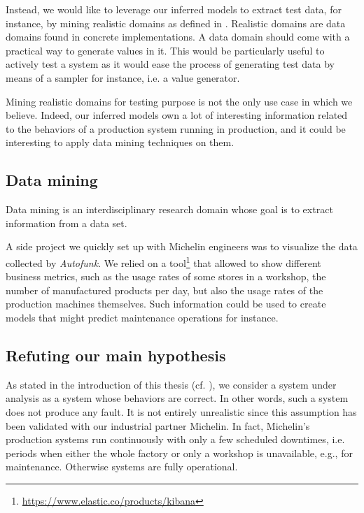 Instead, we would like to leverage our inferred models to extract
test data, for instance, by mining realistic domains as defined
in \cite{Enderlin:2011:PSL:2075545.2075551}. Realistic domains
are data domains found in concrete implementations. A data domain
should come with a practical way to generate values in it. This
would be particularly useful to actively test a system as it
would ease the process of generating test data by means of a
sampler for instance, i.e. a value generator.

Mining realistic domains for testing purpose is not the only use
case in which we believe. Indeed, our inferred models own a lot
of interesting information related to the behaviors of a
production system running in production, and it could be
interesting to apply data mining techniques on them.

\subsection{Data mining}
\label{sec:conclusion:testing:data}

Data mining \cite{chakrabarti2006data} is an interdisciplinary
research domain whose goal is to extract information from a data
set.

A side project we quickly set up with Michelin engineers was to
visualize the data collected by \textit{Autofunk}. We relied on a
tool\footnote{\url{https://www.elastic.co/products/kibana}} that
allowed to show different business metrics, such as the usage
rates of some stores in a workshop, the number of manufactured
products per day, but also the usage rates of the production
machines themselves. Such information could be used to create
models that might predict maintenance operations for instance.



\subsection{Refuting our main hypothesis}
\label{sec:conclusion:testing:valid}

As stated in the introduction of this thesis (cf.
), we consider a system
under analysis as a system whose behaviors are correct. In other
words, such a system does not produce any fault. It is not
entirely unrealistic since this assumption has been validated
with our industrial partner Michelin. In fact, Michelin's
production systems run continuously with only a few scheduled
downtimes, i.e. periods when either the whole factory or only a
workshop is unavailable, e.g., for maintenance. Otherwise systems
are fully operational.

